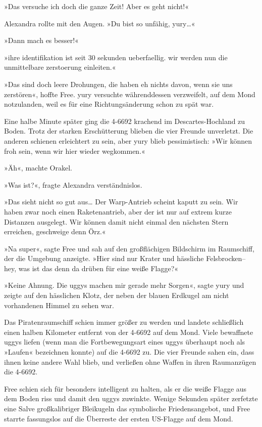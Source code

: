 »Das versuche ich doch die ganze Zeit! Aber es geht nicht!«

Alexandra rollte mit den Augen. »Du bist so unfähig, yury…«

»Dann mach es besser!«

»ihre identifikation ist seit 30 sekunden ueberfaellig. wir werden nun die unmittelbare zerstoerung einleiten.«

»Das sind doch leere Drohungen, die haben eh nichts davon, wenn sie uns zerstören«, hoffte Free. yury versuchte währenddessen verzweifelt, auf dem Mond notzulanden, weil es für eine Richtungsänderung schon zu spät war.

Eine halbe Minute später ging die 4-6692 krachend im Descartes-Hochland zu Boden. Trotz der starken Erschütterung blieben die vier Freunde unverletzt. Die anderen schienen erleichtert zu sein, aber yury blieb pessimistisch: »Wir können froh sein, wenn wir hier wieder wegkommen.«

»Äh«, machte Orakel.

»Was ist?«, fragte Alexandra verständnislos.

»Das sieht nicht so gut aus… Der Warp-Antrieb scheint kaputt zu sein. Wir haben zwar noch einen Raketenantrieb, aber der ist nur auf extrem kurze Distanzen ausgelegt. Wir können damit nicht einmal den nächsten Stern erreichen, geschweige denn Örz.«

»Na super«, sagte Free und sah auf den großflächigen Bildschirm im Raumschiff, der die Umgebung anzeigte. »Hier sind nur Krater und hässliche Felsbrocken– hey, was ist das denn da drüben für eine weiße Flagge?«

»Keine Ahnung. Die uggys machen mir gerade mehr Sorgen«, sagte yury und zeigte auf den hässlichen Klotz, der neben der blauen Erdkugel am nicht vorhandenen Himmel zu sehen war.

Das Piratenraumschiff schien immer größer zu werden und landete schließlich einen halben Kilometer entfernt von der 4-6692 auf dem Mond. Viele bewaffnete uggys liefen (wenn man die Fortbewegungsart eines uggys überhaupt noch als »Laufen« bezeichnen konnte) auf die 4-6692 zu. Die vier Freunde sahen ein, dass ihnen keine andere Wahl blieb, und verließen ohne Waffen in ihren Raumanzügen die 4-6692.

Free schien sich für besonders intelligent zu halten, als er die weiße Flagge aus dem Boden riss und damit den uggys zuwinkte. Wenige Sekunden später zerfetzte eine Salve großkalibriger Bleikugeln das symbolische Friedensangebot, und Free starrte fassungslos auf die Überreste der ersten US-Flagge auf dem Mond.

